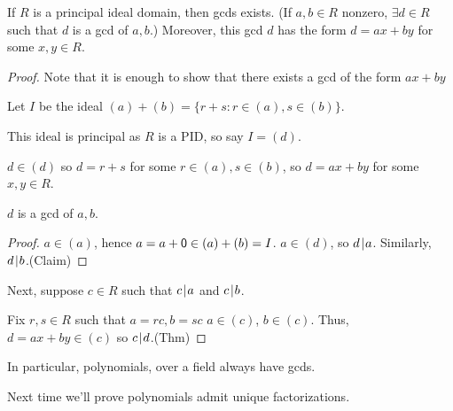 \documentclass[notes.tex]{subfiles}
\begin{document}
\begin{theorem}
	If $R$ is a principal ideal domain, then gcds exists. (If $a,b\in R$ nonzero, $\exists d\in R$ such that $d$ is a gcd of $a, b$.) Moreover, this gcd $d$ has the form $d=ax+by$ for some $x, y\in R$.
\end{theorem}
\begin{proof}
	Note that it is enough to show that there exists a gcd of the form $ax+by$

	Let $I$ be the ideal $(a) + (b) = \{r + s : r\in (a), s\in (b)\}$.

	This ideal is principal as $R$ is a PID, so say $I = (d)$.

	$d\in (d)$ so $d = r + s$ for some $r\in (a), s\in (b)$, so $d = ax+by$ for some $x,y\in R$.

	\begin{claim}
		$d$ is a gcd of $a, b$.
	\end{claim}
	\begin{proof}
		$a\in (a)$, hence $a = a + \mathsf{0}\in (a) + (b) = I$.
		$a\in (d)$, so $d\mkern2mu|\mkern1mu a$.
		Similarly, $d\mkern2mu|\mkern1mu b$.\qedhere(Claim)
	\end{proof}

	Next, suppose $c\in R$ such that $c\mkern2mu|\mkern1mu a$ and $c\mkern2mu|\mkern1mu b$.


	Fix $r,s\in R$ such that $a=rc, b=sc$ $a\in (c)$, $b\in (c)$. Thus, $d = ax + by \in (c)$ so $c\mkern2mu|\mkern1mu d$.\qedhere(Thm)
\end{proof}

In particular, polynomials, over a field always have gcds.

Next time we'll prove polynomials admit unique factorizations.
\end{document}
